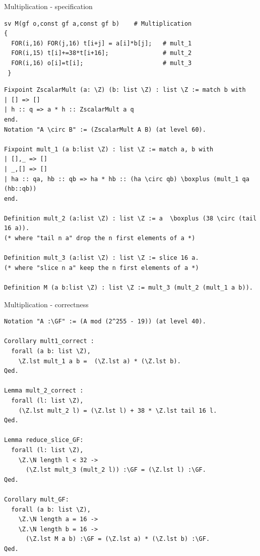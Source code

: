 \documentclass[8pt]{beamer}
\begin{document}
%
%

\begin{frame}[fragile]{Multiplication - specification}
  \begin{center}
\begin{lstlisting}[language=cnacl, caption=M, label=cod:languageC101]
sv M(gf o,const gf a,const gf b)    # Multiplication
{
  FOR(i,16) FOR(j,16) t[i+j] = a[i]*b[j];   # mult_1
  FOR(i,15) t[i]+=38*t[i+16];               # mult_2
  FOR(i,16) o[i]=t[i];                      # mult_3
 }
\end{lstlisting}

\begin{lstlisting}[language=Coq, caption=Multiplication, label=cod:languageC102]
Fixpoint ZscalarMult (a: \Z) (b: list \Z) : list \Z := match b with
| [] => []
| h :: q => a * h :: ZscalarMult a q
end.
Notation "A \circ B" := (ZscalarMult A B) (at level 60).

Fixpoint mult_1 (a b:list \Z) : list \Z := match a, b with
| [],_ => []
| _,[] => []
| ha :: qa, hb :: qb => ha * hb :: (ha \circ qb) \boxplus (mult_1 qa (hb::qb))
end.

Definition mult_2 (a:list \Z) : list \Z := a  \boxplus (38 \circ (tail 16 a)).
(* where "tail n a" drop the n first elements of a *)

Definition mult_3 (a:list \Z) : list \Z := slice 16 a.
(* where "slice n a" keep the n first elements of a *)

Definition M (a b:list \Z) : list \Z := mult_3 (mult_2 (mult_1 a b)).
\end{lstlisting}

  \end{center}
\end{frame}

%
%

\begin{frame}[fragile]{Multiplication - correctness}
  \begin{center}
\begin{lstlisting}[language=Coq, caption=Multiplication | proof of correctness, label=cod:languageC111]
Notation "A :\GF" := (A mod (2^255 - 19)) (at level 40).

Corollary mult1_correct :
  forall (a b: list \Z),
    \Z.lst mult_1 a b =  (\Z.lst a) * (\Z.lst b).
Qed.

Lemma mult_2_correct :
  forall (l: list \Z),
    (\Z.lst mult_2 l) = (\Z.lst l) + 38 * \Z.lst tail 16 l.
Qed.

Lemma reduce_slice_GF:
  forall (l: list \Z),
    \Z.\N length l < 32 ->
      (\Z.lst mult_3 (mult_2 l)) :\GF = (\Z.lst l) :\GF.
Qed.

Corollary mult_GF:
  forall (a b: list \Z),
    \Z.\N length a = 16 ->
    \Z.\N length b = 16 ->
      (\Z.lst M a b) :\GF = (\Z.lst a) * (\Z.lst b) :\GF.
Qed.
\end{lstlisting}

  \end{center}
\end{frame}
\end{document}
